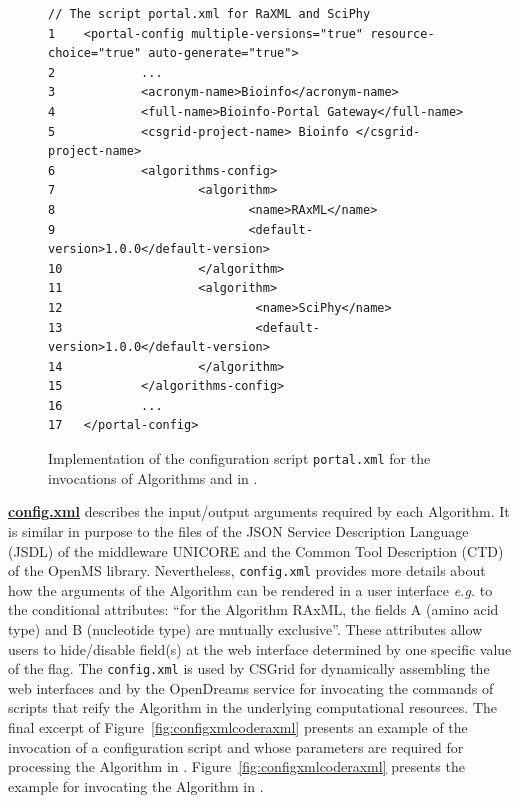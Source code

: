  \begin{figure}[!t]
 \begin{lstlisting}[style=myScalastyle]
 // The script portal.xml for RaXML and SciPhy
1    <portal-config multiple-versions="true" resource-choice="true" auto-generate="true">
2            ...
3            <acronym-name>Bioinfo</acronym-name>
4            <full-name>Bioinfo-Portal Gateway</full-name>
5            <csgrid-project-name> Bioinfo </csgrid-project-name>
6            <algorithms-config>
7                    <algorithm>
8                           <name>RAxML</name>
9                           <default-version>1.0.0</default-version>
10                   </algorithm>
11                   <algorithm>
12                           <name>SciPhy</name>
13                           <default-version>1.0.0</default-version>
14                   </algorithm>
15           </algorithms-config>
16           ...
17   </portal-config>

\end{lstlisting}
\vspace{-10px}
\caption{Implementation of the configuration script \texttt{portal.xml} for the invocations of Algorithms \raxml and \sci in \system.}
\label{fig:portalxmlcode}
\end{figure}

\underline{\textbf{config.xml}} describes the input/output arguments required by each Algorithm. It is similar in purpose to the files of the JSON Service Description Language (JSDL) of the middleware UNICORE \cite{ref10.1007/11508380_38} and the Common Tool Description (CTD) of the OpenMS library. Nevertheless, \texttt{config.xml} provides more details about how the arguments of the Algorithm can be rendered in a user interface \textit{e.g.} to the conditional attributes: “for the Algorithm RAxML, the fields A (amino acid type) and B (nucleotide type) are mutually exclusive”. These attributes allow users to hide/disable field(s) at the web interface determined by one specific value of the flag. The \texttt{config.xml} is used by CSGrid for dynamically assembling the web interfaces and by the OpenDreams service for invocating the commands of scripts that reify the Algorithm in the underlying computational resources. The final excerpt of Figure~\ref{fig:configxmlcoderaxml} presents an example of the invocation of a configuration script and whose parameters are required for processing the Algorithm \raxml in \system. Figure~\ref{fig:configxmlcoderaxml} presents the example for invocating the Algorithm \sci in \system. 


